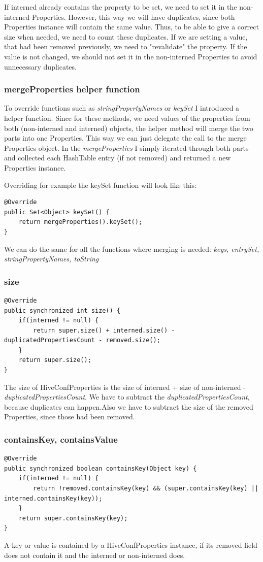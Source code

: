 If interned already contains the property to be set, we need to set it in the non-interned Properties. However, this way we will have duplicates, since both Properties instance will contain the same value. Thus, to be able to give a correct size when needed, we need to count these duplicates. If we are setting a value, that had been removed previously, we need to "revalidate" the property. If the value is not changed, we should not set it in the non-interned Properties to avoid unnecessary duplicates. 

\subsubsection{mergeProperties helper function}
To override functions such as \textit{stringPropertyNames} or \textit{keySet} \etc I introduced a helper function. Since for these methods, we need values of the properties from both (non-interned and interned) objects, the helper method will merge the two parts into one Properties. This way we can just delegate the call to the merge Properties object. In the \textit{mergeProperties} I simply iterated through both parts and collected each HashTable entry (if not removed) and returned a new Properties instance. 

Overriding for example the keySet function will look like this:
\begin{lstlisting}
@Override
public Set<Object> keySet() {
	return mergeProperties().keySet();
}
\end{lstlisting}

We can do the same for all the functions where merging is needed: \textit{keys, entrySet, stringPropertyNames, toString \etc}

\subsubsection{size}
\begin{lstlisting}
@Override
public synchronized int size() {
	if(interned != null) {
		return super.size() + interned.size() - duplicatedPropertiesCount - removed.size();
	}
	return super.size();
}
\end{lstlisting}
The size of HiveConfProperties is the size of interned + size of non-interned - \textit{duplicatedPropertiesCount}. We have to subtract the \textit{duplicatedPropertiesCount}, because duplicates can happen.Also we have to subtract the size of the removed Properties, since those had been removed.

\subsubsection{containsKey, containsValue}
\begin{lstlisting}
@Override
public synchronized boolean containsKey(Object key) {
	if(interned != null) {
		return !removed.containsKey(key) && (super.containsKey(key) || interned.containsKey(key));
	}
	return super.containsKey(key);
}
\end{lstlisting}
A key or value is contained by a HiveConfProperties instance, if its removed field does not contain it and the interned or non-interned does.

